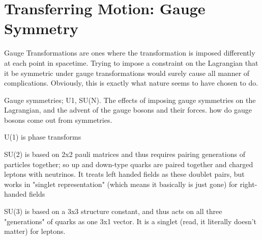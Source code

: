 
    \cite{Halzen_book}


\section{Transferring Motion: Gauge Symmetry}
    Gauge Transformations are ones where the transformation is imposed differently at each point in spacetime.
    Trying to impose a constraint on the Lagrangian that it be symmetric under gauge transformations would surely cause all manner of complications.
    Obviously, this is exactly what nature seems to have chosen to do.

    Gauge symmetries; U1, SU(N).
    The effects of imposing gauge symmetries on the Lagrangian, and the advent of the gauge bosons and their forces.
    how do gauge bosons come out from symmetries.

    U(1) is phase transforms

    SU(2) is based on 2x2 pauli matrices and thus requires pairing generations of particles together;
        so up and down-type quarks are paired together and charged leptons with neutrinos.
    It treats left handed fields as these doublet pairs,
        but works in "singlet representation" (which means it basically is just gone) for right-handed fields

    SU(3) is based on a 3x3 structure constant, and thus acts on all three "generations" of quarks as one 3x1 vector.
    It is a singlet (read, it literally doesn't matter) for leptons.
    
    \cite{Osborn_notes}
    \cite{Peskin_book}
    \cite{Halzen_book}

